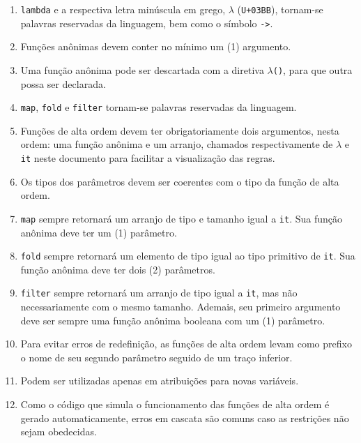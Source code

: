 \documentclass{article}
\newenvironment{smallenum}{
    \vspace{-1mm}
    \begin{enumerate}[label=\roman*.]
    \setlength{\parskip}{0pt}
    \setlength{\itemsep}{2pt}
}{
    \vspace{-2mm}
    \end{enumerate}
}
\begin{document}
\begin{smallenum}

\item \texttt{lambda} e a respectiva letra minúscula em grego, $\lambda$
    (\texttt{U+03BB}), tornam-se palavras reservadas da linguagem, bem como
    o símbolo \texttt{->}.

\item Funções anônimas devem conter no mínimo um (1) argumento.

\item Uma função anônima pode ser descartada com a diretiva
    \texttt{$\lambda$()}, para que outra possa ser declarada.

\item \texttt{map}, \texttt{fold} e \texttt{filter} tornam-se palavras
    reservadas da linguagem.

\item Funções de alta ordem devem ter obrigatoriamente dois argumentos,
    nesta ordem: uma função anônima e um arranjo, chamados respectivamente
    de \texttt{$\lambda$} e \texttt{it} neste documento para facilitar a
    visualização das regras.

\item Os tipos dos parâmetros devem ser coerentes com o tipo da função de alta
    ordem.

\item \texttt{map} sempre retornará um arranjo de tipo e tamanho
    igual a \texttt{it}. Sua função anônima deve ter um (1) parâmetro.

\item \texttt{fold} sempre retornará um elemento de tipo igual ao tipo
    primitivo de \texttt{it}. Sua função anônima deve ter dois (2) parâmetros.

\item \texttt{filter} sempre retornará um arranjo de tipo igual a
    \texttt{it}, mas não necessariamente com o mesmo tamanho. Ademais,
    seu primeiro argumento deve ser sempre uma função anônima booleana
    com um (1) parâmetro.

\item Para evitar erros de redefinição, as funções de alta ordem levam como
    prefixo o nome de seu segundo parâmetro seguido de um traço inferior.

\item Podem ser utilizadas apenas em atribuições para novas variáveis.

\item Como o código que simula o funcionamento das funções de alta ordem
    é gerado automaticamente, erros em cascata são comuns caso as restrições
    não sejam obedecidas.

\end{smallenum}
\end{document}
